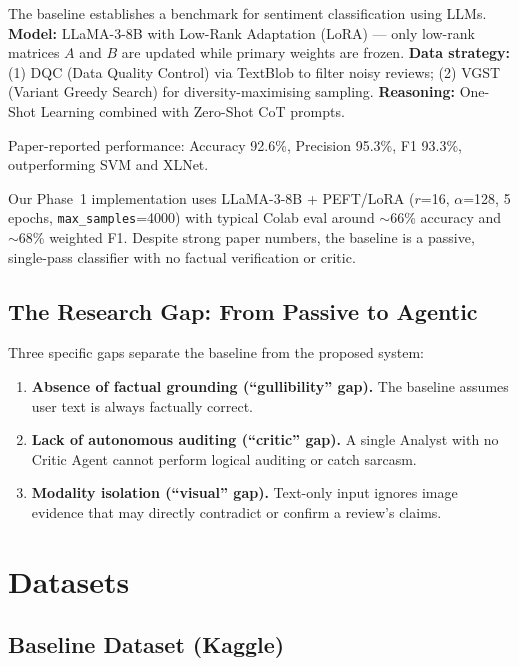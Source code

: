\documentclass[12pt,a4paper]{article}
\begin{document}
The baseline establishes a benchmark for sentiment classification using LLMs.
\textbf{Model:} LLaMA-3-8B with Low-Rank Adaptation (LoRA) --- only low-rank matrices $A$
and $B$ are updated while primary weights are frozen.
\textbf{Data strategy:} (1) DQC (Data Quality Control) via TextBlob to filter noisy reviews;
(2) VGST (Variant Greedy Search) for diversity-maximising sampling.
\textbf{Reasoning:} One-Shot Learning combined with Zero-Shot CoT prompts.

Paper-reported performance: Accuracy 92.6\%, Precision 95.3\%, F1 93.3\%, outperforming
SVM and XLNet.

Our Phase~1 implementation uses LLaMA-3-8B + PEFT/LoRA ($r$=16, $\alpha$=128, 5 epochs,
\texttt{max\_samples}=4000) with typical Colab eval around $\sim$66\% accuracy and $\sim$68\%
weighted F1. Despite strong paper numbers, the baseline is a passive, single-pass classifier
with no factual verification or critic.

\subsection{The Research Gap: From Passive to Agentic}

Three specific gaps separate the baseline from the proposed system:

\begin{enumerate}[leftmargin=*]
  \item \textbf{Absence of factual grounding (``gullibility'' gap).} The baseline assumes user
    text is always factually correct.

  \item \textbf{Lack of autonomous auditing (``critic'' gap).} A single Analyst with no Critic
    Agent cannot perform logical auditing or catch sarcasm.

  \item \textbf{Modality isolation (``visual'' gap).} Text-only input ignores image evidence
    that may directly contradict or confirm a review's claims.
\end{enumerate}

\section{Datasets}

\subsection{Baseline Dataset (Kaggle)}
\end{document}
